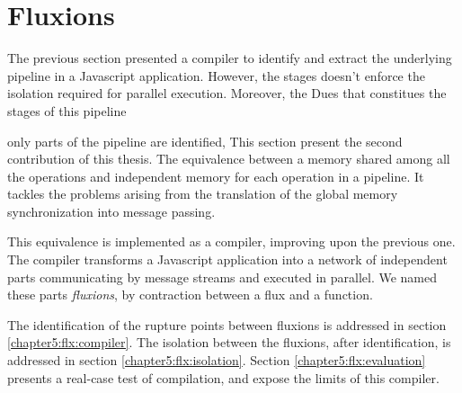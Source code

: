 \section{Fluxions} \label{chapter5:flx}

The previous section presented a compiler to identify and extract the underlying pipeline in a Javascript application.
However, the stages doesn't enforce the isolation required for parallel execution.
Moreover, the Dues that constitues the stages of this pipeline 

only parts of the pipeline are identified, 
This section present the second contribution of this thesis.
The equivalence between a memory shared among all the operations and independent memory for each operation in a pipeline.
It tackles the problems arising from the translation of the global memory synchronization into message passing.

This equivalence is implemented as a compiler, improving upon the previous one.
The compiler transforms a Javascript application into a network of independent parts communicating by message streams and executed in parallel.
We named these parts \textit{fluxions}, by contraction between a flux and a function.


The identification of the rupture points between fluxions is addressed in section \ref{chapter5:flx:compiler}.
The isolation between the fluxions, after identification, is addressed in section \ref{chapter5:flx:isolation}.
Section \ref{chapter5:flx:evaluation} presents a real-case test of compilation, and expose the limits of this compiler.



